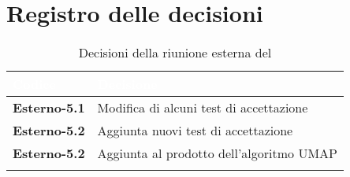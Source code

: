 \section{Registro delle decisioni}
{
\renewcommand{\arraystretch}{1.5}
\centering
\begin{longtable}{C{3cm} C{9cm}}
\textcolor{white}{\textbf{Codice}}&
\textcolor{white}{\textbf{Decisione}}\\	
\endhead
		
\textbf{Esterno-5.1} & Modifica di alcuni test di accettazione\\
\textbf{Esterno-5.2} & Aggiunta nuovi test di accettazione\\

\textbf{Esterno-5.2} & Aggiunta al prodotto dell'algoritmo UMAP\\

\caption{Decisioni della riunione esterna del \Data{}}
		
\end{longtable}
}
